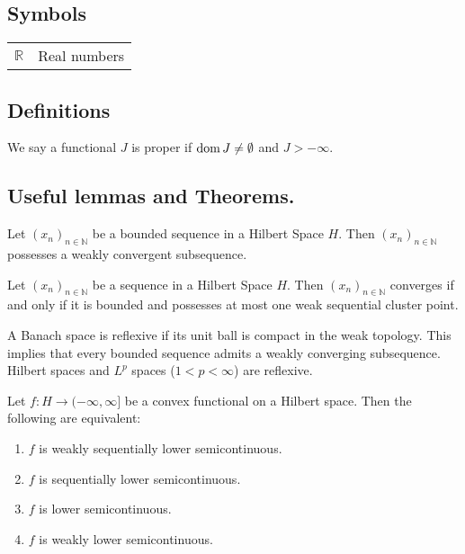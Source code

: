 \subsection{Symbols}
\begin{tabular}{ll}
	$\mathbb{R}$ & Real numbers \\
	
\end{tabular}

\subsection{Definitions}
\begin{definition}
	We say a functional $J$ is proper if $\mathrm{dom\,} J \neq \emptyset$ and $J>-\infty$.
\end{definition}
\subsection{Useful lemmas and Theorems.}
\begin{lemma}
	\label{lemma0. Bounded and weakly convergent}
	Let $(x_n)_{n \in \mathbb{N}}$ be a bounded sequence in a Hilbert Space $H$. Then $(x_n)_{n \in \mathbb{N}}$ possesses a weakly convergent subsequence.
\end{lemma}

\begin{lemma}
Let $(x_n)_{n \in \mathbb{N}}$ be a sequence in a Hilbert Space $H$. Then $(x_n)_{n \in \mathbb{N}}$ converges if and only if it is bounded and possesses at most one weak sequential cluster point.
\end{lemma}
\begin{fact}
	A Banach space is reflexive if its unit ball is compact in the weak topology. This implies that every bounded sequence admits a weakly converging subsequence. Hilbert spaces and $L^p$ spaces ($1<p<\infty$) are reflexive.
\end{fact}
\begin{theorem} 
	Let $f: H \rightarrow (−\infty, \infty]$ be a convex functional on a Hilbert space. Then the following are equivalent:
	\begin{enumerate}[label=(\roman{*})]
\item 	$f$ is weakly sequentially lower semicontinuous.
\item 	$f$ is sequentially lower semicontinuous.
\item 	$f$ is lower semicontinuous.
\item 	$f$ is weakly lower semicontinuous.
	\end{enumerate}
\end{theorem}

